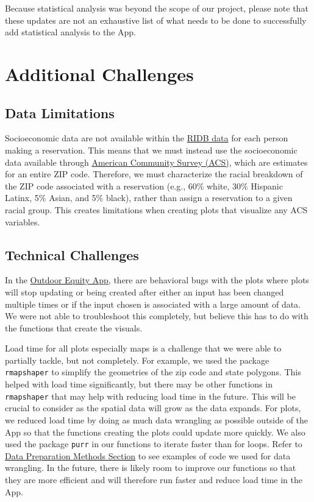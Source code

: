\documentclass[
  11 pt,
  openany]{book}
\begin{document}
Because statistical analysis was beyond the scope of our project, please note that these updates are not an exhaustive list of what needs to be done to successfully add statistical analysis to the App.

\hypertarget{additional-challenges}{%
\chapter{Additional Challenges}\label{additional-challenges}}

\hypertarget{data-limitations}{%
\section{Data Limitations}\label{data-limitations}}

Socioeconomic data are not available within the \href{https://ridb.recreation.gov/landing}{RIDB data} for each person making a reservation. This means that we must instead use the socioeconomic data available through \href{https://www.census.gov/programs-surveys/acs/data.html}{American Community Survey (ACS)}, which are estimates for an entire ZIP code. Therefore, we must characterize the racial breakdown of the ZIP code associated with a reservation (e.g., 60\% white, 30\% Hispanic Latinx, 5\% Asian, and 5\% black), rather than assign a reservation to a given racial group. This creates limitations when creating plots that visualize any ACS variables.

\hypertarget{technical-challenges}{%
\section{Technical Challenges}\label{technical-challenges}}

In the \href{https://shinyapps.bren.ucsb.edu/oe_app/}{Outdoor Equity App}, there are behavioral bugs with the plots where plots will stop updating or being created after either an input has been changed multiple times or if the input chosen is associated with a large amount of data. We were not able to troubleshoot this completely, but believe this has to do with the functions that create the visuals.

Load time for all plots especially maps is a challenge that we were able to partially tackle, but not completely. For example, we used the package \texttt{rmapshaper} \citep{R-rmapshaper} to simplify the geometries of the zip code and state polygons. This helped with load time significantly, but there may be other functions in \texttt{rmapshaper} \citep{R-rmapshaper} that may help with reducing load time in the future. This will be crucial to consider as the spatial data will grow as the data expands. For plots, we reduced load time by doing as much data wrangling as possible outside of the App so that the functions creating the plots could update more quickly. We also used the package \texttt{purr} \citep{R-purrr} in our functions to iterate faster than for loops. Refer to \protect\hyperlink{data-preparation-methods}{Data Preparation Methods Section} to see examples of code we used for data wrangling. In the future, there is likely room to improve our functions so that they are more efficient and will therefore run faster and reduce load time in the App.
\end{document}
